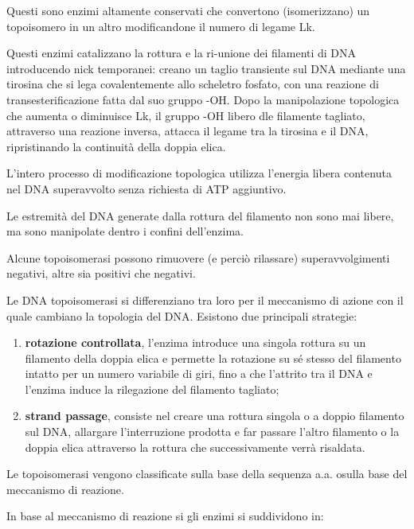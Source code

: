 \documentclass[11pt]{book}
\begin{document}
Questi sono enzimi altamente conservati che convertono (isomerizzano) un
topoisomero in un altro modificandone il numero di legame Lk.

Questi enzimi catalizzano la rottura e la ri-unione dei filamenti di DNA
introducendo nick temporanei: creano un taglio transiente sul DNA
mediante una tirosina che si lega covalentemente allo scheletro fosfato,
con una reazione di transesterificazione fatta dal suo gruppo -OH. Dopo
la manipolazione topologica che aumenta o diminuisce Lk, il gruppo -OH
libero dle filamente tagliato, attraverso una reazione inversa, attacca
il legame tra la tirosina e il DNA, ripristinando la continuità della
doppia elica.

L'intero processo di modificazione topologica utilizza l'energia libera
contenuta nel DNA superavvolto senza richiesta di ATP aggiuntivo.

Le estremità del DNA generate dalla rottura del filamento non sono mai
libere, ma sono manipolate dentro i confini dell'enzima.

Alcune topoisomerasi possono rimuovere (e perciò rilassare)
superavvolgimenti negativi, altre sia positivi che negativi.

Le DNA topoisomerasi si differenziano tra loro per il meccanismo di
azione con il quale cambiano la topologia del DNA. Esistono due
principali strategie:

\begin{enumerate}
\def\labelenumi{\arabic{enumi}.}
\itemsep1pt\parskip0pt
\item
  \textbf{rotazione controllata}, l'enzima introduce una singola rottura
  su un filamento della doppia elica e permette la rotazione su sé
  stesso del filamento intatto per un numero variabile di giri, fino a
  che l'attrito tra il DNA e l'enzima induce la rilegazione del
  filamento tagliato;
\item
  \textbf{strand passage}, consiste nel creare una rottura singola o a
  doppio filamento sul DNA, allargare l'interruzione prodotta e far
  passare l'altro filamento o la doppia elica attraverso la rottura che
  successivamente verrà risaldata.
\end{enumerate}

Le topoisomerasi vengono classificate sulla base della sequenza a.a.
osulla base del meccanismo di reazione.

In base al meccanismo di reazione si gli enzimi si suddividono in:
\end{document}
